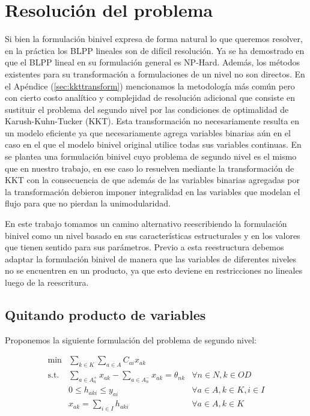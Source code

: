 \chapter{Resolución del problema}
\label{sect:problemresolution}

Si bien la formulación binivel expresa de forma natural lo que queremos resolver, en la práctica los BLPP lineales son de difícil resolución. Ya se ha demostrado en \cite{bardbook} que el BLPP lineal en su formulación general es NP-Hard. Además, los métodos existentes para su transformación a formulaciones de un nivel no son directos. En el Apéndice (\ref{sec:kkttransform}) mencionamos la metodología más común pero con cierto costo analítico y complejidad de resolución adicional que consiste en sustituir el problema del segundo nivel por las condiciones de optimalidad de Karush-Kuhn-Tucker (KKT). Esta transformación no necesariamente resulta en un modelo eficiente ya que necesariamente agrega variables binarias aún en el caso en el que el modelo binivel original utilice todas sus variables continuas. En \cite{kara2004} se plantea una formulación binivel cuyo problema de segundo nivel es el mismo que en nuestro trabajo, en ese caso lo resuelven mediante la transformación de KKT con la consecuencia de que además de las variables binarias agregadas por la transformación debieron imponer integralidad en las variables que modelan el flujo para que no pierdan la unimodularidad.

En este trabajo tomamos un camino alternativo reescribiendo la formulación binivel como un nivel basado en sus características estructurales y en los valores que tienen sentido para sus parámetros. Previo a esta reestructura debemos adaptar la formulación binivel de manera que las variables de diferentes niveles no se encuentren en un producto, ya que esto deviene en restricciones no lineales luego de la reescritura.

\section{Quitando producto de variables}
\label{sect:variableproductremoval}

Proponemos la siguiente formulación del problema de segundo nivel:

\begin{align}
  \min        & \sum_{k \in K} \sum_{a \in A} C_{ai} x_{ak}         & \label{eq:subproblemrefeq1} \\
  \text{s.t.} & \sum_{a \in A_n^+} x_{ak} - \sum_{a \in A_n^-} x_{ak} = \theta_{nk} & \forall n \in N, k \in OD \\
              & 0 \leq h_{aki} \leq y_{ai}                                          & \forall a \in A, k \in K, i \in I \\
              & x_{ak} = \sum_{i \in I} h_{aki}                                     & \forall a \in A, k \in K \label{eq:subproblemrefeq4}
\end{align}

